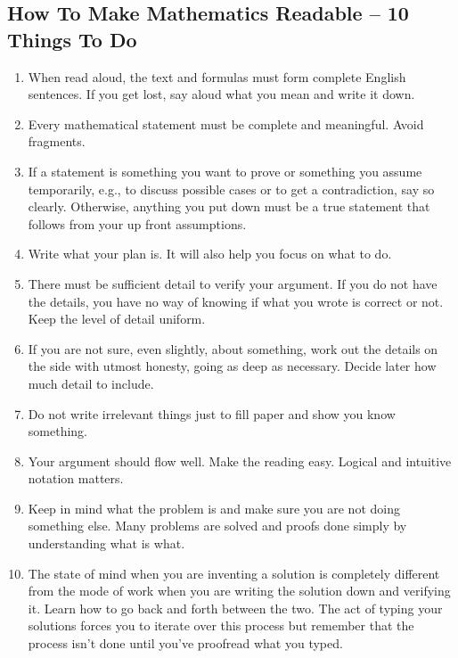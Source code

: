 \subsection{How To Make Mathematics Readable -- 10 Things To Do}
\begin{enumerate}
    \item When read aloud, the text and formulas must form complete English sentences. If
        you get lost, say aloud what you mean and write it down.
    \item Every mathematical statement must be complete and meaningful. Avoid fragments.
    \item If a statement is something you want to prove or something you assume
        temporarily, e.g., to discuss possible cases or to get a contradiction, say so
        clearly. Otherwise, anything you put down must be a true statement that follows
        from your up front assumptions.
    \item Write what your plan is.  It will also help you focus on what to do.
    \item There must be sufficient detail to verify your argument. If you do not have the
        details, you have no way of knowing if what you wrote is correct or not. Keep the
        level of detail uniform.
    \item If you are not sure, even slightly, about something, work out the details on the
        side with utmost honesty, going as deep as necessary. Decide later how much detail
        to include. 
    \item Do not write irrelevant things just to fill paper and show you know something.
    \item Your argument should flow well. Make the reading easy. Logical and intuitive
        notation matters.
    \item Keep in mind what the problem is and make sure you are not doing something else.
        Many problems are solved and proofs done simply by understanding what is what.
    \item The state of mind when you are inventing a solution is completely different from
        the mode of work when you are writing the solution down and verifying it.  Learn
        how to go back and forth between the two. The act of typing your solutions forces
        you to iterate over this process but remember that the process isn't done until
        you've proofread what you typed.
\end{enumerate}



